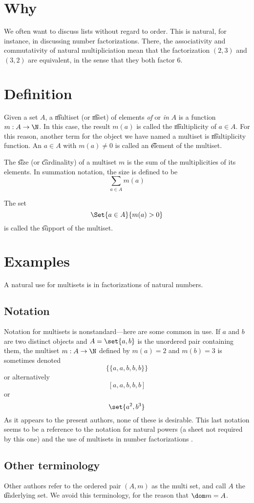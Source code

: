 
\section*{Why}

We often want to discuss lists without regard to order.
This is natural, for instance, in discussing number factorizations.
There, the associativity and commutativity of natural multipliciation mean that the factorization $(2, 3)$ and $(3,2)$ are equivalent, in the sense that they both factor 6.

\section*{Definition}

Given a set $A$, a \t{multiset} (or \t{mset}) of elements \textit{of} or \textit{in} $A$ is a function $m: A \to \N  $.
In this case, the result $m(a)$ is called the \t{multiplicity} of $a \in A$.
For this reason, another term for the object we have named a multiset is \t{multiplicity function}.
An $a \in A$ with $m(a) \neq 0$ is called an \t{element} of the multiset.

The \t{size} (or \t{cardinality}) of a multiset $m$ is the sum of the multiplicities of its elements.
In summation notation, the size is defined to be
\[
\sum_{a \in A} m(a)
\]

The set
\[
\Set{a \in A}{m(a) > 0}
\]
is called the \t{support} of the multiset.

\section*{Examples}

A natural use for multisets is in factorizations of natural numbers.

\subsection*{Notation}

Notation for multisets is nonstandard---here are some common in use.
If $a$ and $b$ are two distinct objects and $A = \set{a, b}$ is the unordered pair containing them, the multiset $m: A \to \N  $ defined by $m(a) = 2$ and $m(b) = 3$ is sometimes denoted
\[
\{ \{ a,a,b,b,b\} \}
\]
or alternatively
\[
[a,a,b,b,b]
\]
or
\[
\set{a^2, b^3}
\]
As it appears to the present authors, none of these is desirable.
This last notation seems to be a reference to the notation for natural powers (a sheet not required by this one) and the use of multisets in number factorizations .

\subsection*{Other terminology}

Other authors refer to the ordered pair $(A, m)$ as the multi set, and call $A$ the \t{underlying set}.
We avoid this terminology, for the reason that $\dom m = A$.

\blankpage